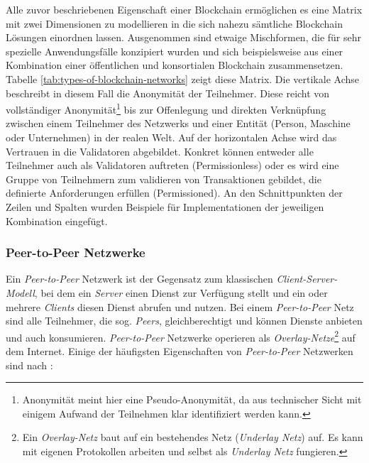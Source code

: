 \noindent
Alle zuvor beschriebenen Eigenschaft einer Blockchain ermöglichen es eine Matrix mit zwei Dimensionen zu modellieren in die sich nahezu sämtliche Blockchain Lösungen einordnen lassen. Ausgenommen sind etwaige Mischformen, die für sehr spezielle Anwendungsfälle konzipiert wurden und sich beispielsweise aus einer Kombination einer öffentlichen und konsortialen Blockchain zusammensetzen. Tabelle \ref{tab:types-of-blockchain-networks} zeigt diese Matrix. Die vertikale Achse beschreibt in diesem Fall die Anonymität der Teilnehmer. Diese reicht von vollständiger Anonymität\footnote{Anonymität meint hier eine Pseudo-Anonymität, da aus technischer Sicht mit einigem Aufwand der Teilnehmen klar identifiziert werden kann.} bis zur Offenlegung und direkten Verknüpfung zwischen einem Teilnehmer des Netzwerks und einer Entität (Person, Maschine oder Unternehmen) in der realen Welt. Auf der horizontalen Achse wird das Vertrauen in die Validatoren abgebildet. Konkret können entweder alle Teilnehmer auch als Validatoren auftreten (Permissionless) oder es wird eine Gruppe von Teilnehmern zum validieren von Transaktionen gebildet, die definierte Anforderungen erfüllen (Permissioned). An den Schnittpunkten der Zeilen und Spalten wurden Beispiele für Implementationen der jeweiligen Kombination eingefügt.


\subsubsection{Peer-to-Peer Netzwerke}
Ein \textit{Peer-to-Peer} Netzwerk ist der Gegensatz zum klassischen \textit{Client-Server-Modell}, bei dem ein \textit{Server} einen Dienst zur Verfügung stellt und ein oder mehrere \textit{Clients} diesen Dienst abrufen und nutzen. Bei einem \textit{Peer-to-Peer} Netz sind alle Teilnehmer, die sog. \textit{Peers}, gleichberechtigt und können Dienste anbieten und auch konsumieren. \textit{Peer-to-Peer} Netzwerke operieren als \textit{Overlay-Netze}\footnote{Ein \textit{Overlay-Netz} baut auf ein bestehendes Netz (\textit{Underlay Netz}) auf. Es kann mit eigenen Protokollen arbeiten und selbst als \textit{Underlay Netz} fungieren.\citep{Andersen2001}} auf dem Internet. Einige der häufigsten Eigenschaften von \textit{Peer-to-Peer} Netzwerken sind nach \citet{Steinmetz2005}:

